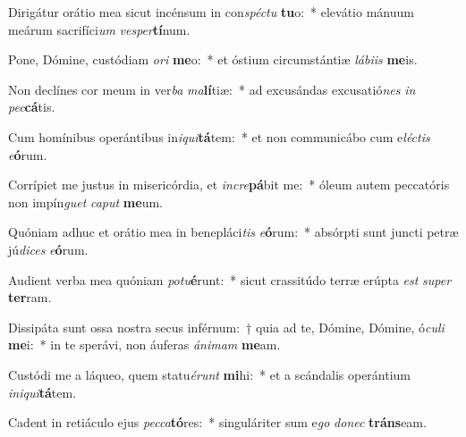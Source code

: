 \item Dirigátur orátio mea sicut incénsum in con\textit{spéc}\textit{tu} \textbf{tu}o:~* elevátio mánuum meárum sacrifíci\textit{um} \textit{ves}\textit{per}\textbf{tí}num.
\item Pone, Dómine, custódiam \textit{o}\textit{ri} \textbf{me}o:~* et óstium circumstántiæ \textit{lá}\textit{bi}\textit{is} \textbf{me}is.
\item Non declínes cor meum in ver\textit{ba} \textit{ma}\textbf{lí}tiæ:~* ad excusándas excusatió\textit{nes} \textit{in} \textit{pec}\textbf{cá}tis.
\item Cum homínibus operántibus in\textit{i}\textit{qui}\textbf{tá}tem:~* et non communicábo cum e\textit{léc}\textit{tis} \textit{e}\textbf{ó}rum.
\item Corrípiet me justus in misericórdia, et \textit{in}\textit{cre}\textbf{pá}bit me:~* óleum autem peccatóris non impín\textit{guet} \textit{ca}\textit{put} \textbf{me}um.
\item Quóniam adhuc et orátio mea in benepláci\textit{tis} \textit{e}\textbf{ó}rum:~* absórpti sunt juncti petræ jú\textit{di}\textit{ces} \textit{e}\textbf{ó}rum.
\item Audient verba mea quóniam \textit{pot}\textit{u}\textbf{é}runt:~* sicut crassitúdo terræ erúpta \textit{est} \textit{su}\textit{per} \textbf{ter}ram.
\item Dissipáta sunt ossa nostra secus inférnum:~† quia ad te, Dómine, Dómine, ó\textit{cu}\textit{li} \textbf{me}i:~* in te sperávi, non áuferas \textit{á}\textit{ni}\textit{mam} \textbf{me}am.
\item Custódi me a láqueo, quem statu\textit{é}\textit{runt} \textbf{mi}hi:~* et a scándalis operántium \textit{in}\textit{i}\textit{qui}\textbf{tá}tem.
\item Cadent in retiáculo ejus \textit{pec}\textit{ca}\textbf{tó}res:~* singuláriter sum e\textit{go} \textit{do}\textit{nec} \textbf{tráns}eam.

